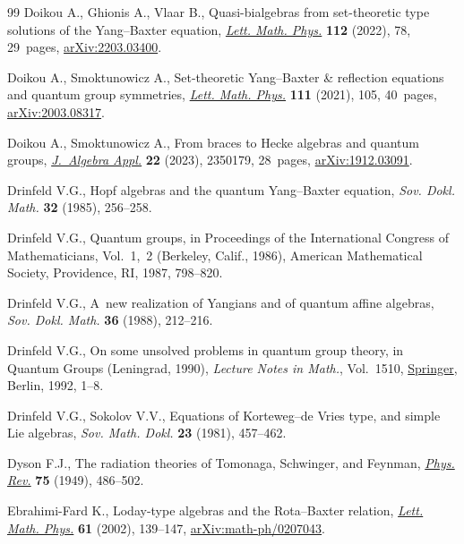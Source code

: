\documentclass[pdftex]{sigma}
\numberwithin{equation}{section}
\theoremstyle{definition}
\begin{document}
\begin{thebibliography}{99}
Doikou A., Ghionis A., Vlaar B., Quasi-bialgebras from set-theoretic type
 solutions of the {Y}ang--{B}axter equation,
 \href{https://doi.org/10.1007/s11005-022-01572-9}{\textit{Lett. Math. Phys.}}
 \textbf{112} (2022), 78, 29~pages,
 \href{http://arxiv.org/abs/2203.03400}{arXiv:2203.03400}.

Doikou A., Smoktunowicz A., Set-theoretic {Y}ang--{B}axter \& reflection
 equations and quantum group symmetries,
 \href{https://doi.org/10.1007/s11005-021-01437-7}{\textit{Lett. Math. Phys.}}
 \textbf{111} (2021), 105, 40~pages,
 \href{http://arxiv.org/abs/2003.08317}{arXiv:2003.08317}.

Doikou A., Smoktunowicz A., From braces to {H}ecke algebras and quantum groups,
 \href{https://doi.org/10.1142/S0219498823501797}{\textit{J.~Algebra Appl.}}
 \textbf{22} (2023), 2350179, 28~pages,
 \href{http://arxiv.org/abs/1912.03091}{arXiv:1912.03091}.

Drinfeld V.G., Hopf algebras and the quantum {Y}ang--{B}axter equation,
 \textit{Sov. Dokl. Math.} \textbf{32} (1985), 256--258.

Drinfeld V.G., Quantum groups, in Proceedings of the {I}nternational {C}ongress
 of {M}athematicians, {V}ol.~1,~2 ({B}erkeley, {C}alif., 1986), American
 Mathematical Society, Providence, RI, 1987, 798--820.

Drinfeld V.G., A~new realization of {Y}angians and of quantum affine algebras,
 \textit{Sov. Dokl. Math.} \textbf{36} (1988), 212--216.

Drinfeld V.G., On some unsolved problems in quantum group theory, in Quantum
 Groups ({L}eningrad, 1990), \textit{Lecture Notes in Math.}, Vol.~1510,
 \href{https://doi.org/10.1007/BFb0101175}{Springer}, Berlin, 1992, 1--8.

Drinfeld V.G., Sokolov V.V., Equations of {K}orteweg--de {V}ries type, and
 simple {L}ie algebras, \textit{Sov. Math. Dokl.} \textbf{23} (1981),
 457--462.

Dyson F.J., The radiation theories of {T}omonaga, {S}chwinger, and {F}eynman,
 \href{https://doi.org/10.1103/PhysRev.75.486}{\textit{Phys. Rev.}}
 \textbf{75} (1949), 486--502.

Ebrahimi-Fard K., Loday-type algebras and the {R}ota--{B}axter relation,
 \href{https://doi.org/10.1023/A:1020712215075}{\textit{Lett. Math. Phys.}}
 \textbf{61} (2002), 139--147,
 \href{http://arxiv.org/abs/math-ph/0207043}{arXiv:math-ph/0207043}.


\end{thebibliography}
\end{document}
